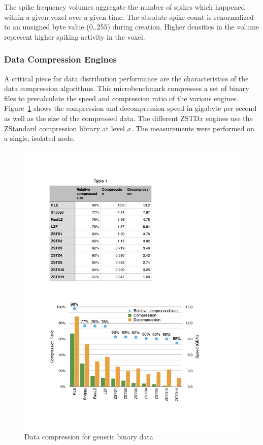 \documentclass[10pt,journal,compsoc]{IEEEtran}
\newcommand{\fig}[1]{Figure~\ref{#1}}
\begin{document}
The spike frequency volumes aggregate the number of spikes which happened within
a given voxel over a given time. The absolute spike count is renormalized to an
unsigned byte value (0..255) during creation. Higher densities in the volume
represent higher spiking activity in the voxel.

\subsubsection{Data Compression Engines}

A critical piece for data distribution performance are the characteristics of
the data compression algorithms. This microbenchmark compresses a set of binary
files to precalculate the speed and compression ratio of the various
engines. \fig{fCompressor} shows the compression and decompression speed in
gigabyte per second as well as the size of the compressed data. The different
ZSTD$x$ engines use the ZStandard compression library at level $x$. The
measurements were performed on a single, isolated node.

\begin{figure}[ht]\center
  \includegraphics[width=\columnwidth]{images/compressor}
  \caption{\label{fCompressor}Data compression for generic binary data}
\end{figure}
\end{document}
